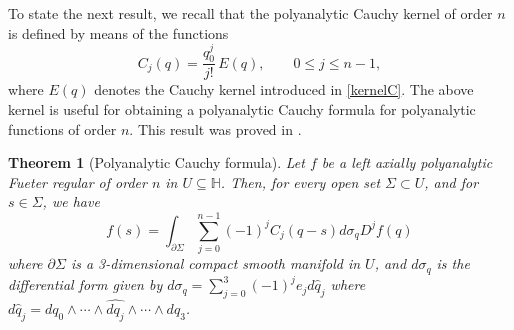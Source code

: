 \documentclass[reqno,11pt]{amsart}
\numberwithin{equation}{section}
\newtheorem{theorem}{Theorem}[section]
\theoremstyle{definition}
\begin{document}
To state the next result, we recall that the polyanalytic Cauchy kernel of order $n$ is defined by means of the functions
\begin{equation}
\label{polyC}
C_j(q)= \frac{q_0^j}{j!}\, E(q), \qquad 0 \le j \le n-1,
\end{equation}
where $E(q)$ denotes the Cauchy kernel introduced in \eqref{kernelC}. The above kernel is useful for obtaining a polyanalytic Cauchy formula for polyanalytic functions of order $n$. This result was proved in \cite{B1976}.
\begin{theorem}[Polyanalytic Cauchy formula]\label{t1}
Let $f$ be a left axially polyanalytic Fueter regular of order $n$ in $U \subseteq \mathbb{H}$. Then, for every open set $\Sigma \subset U$, and for $s \in \Sigma$, we have
\begin{equation}
\label{polyCauchy}
f(s)=\int_{\partial \Sigma} \sum_{j=0}^{n-1} (-1)^j C_j(q-s) d\sigma_q D^j f(q)
\end{equation}
where $\partial \Sigma$ is a 3-dimensional compact smooth manifold in $U$, and $d \sigma_q$ is the differential form given by $d \sigma_q= \sum_{j=0}^3 (-1)^j e_j d \hat{q}_j$ where $d \hat{q}_j= dq_0 \wedge \cdots \wedge \widehat{dq_j} \wedge \cdots \wedge dq_3$.

\end{theorem}
\end{document}
